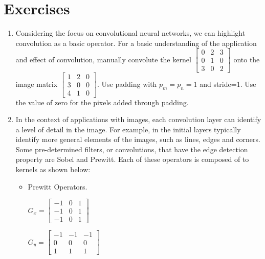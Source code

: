 \newpage
\section{Exercises}

\begin{enumerate}

\item \noindent Considering the focus on convolutional neural networks, we can highlight convolution as a basic operator. For a basic understanding of the application and effect of convolution, manually convolute the kernel $\left[\begin{smallmatrix}
0 & 2 & 3\\
0 & 1 & 0\\
3 & 0 & 2
\end{smallmatrix}\right]$ onto the image matrix $\left[\begin{smallmatrix}
1 & 2 & 0\\
3 & 0 & 0\\
4 & 1 & 0
\end{smallmatrix}\right]$. Use padding with $p_m = p_n = 1$ and stride=1. Use the value of zero for the pixels added through padding.


\item \noindent In the context of applications with images, each convolution layer can identify a level of detail in the image. For example, in the initial layers typically identify more general elements of the images, such as lines, edges and corners. Some pre-determined filters, or convolutions, that have the edge detection property are Sobel and Prewitt. Each of these operators is composed of to kernels as shown below:


\begin{itemize}
\item Prewitt Operators. 

$G_x= \left[\begin{smallmatrix}
-1 & 0 & 1\\
-1 & 0 & 1\\
-1 & 0 & 1
\end{smallmatrix}\right]$

$G_y = \left[\begin{smallmatrix}
-1 & -1 & -1\\
 0 &  0 &  0\\
 1 &  1 &  1
\end{smallmatrix}\right]$


\end{itemize}
\end{enumerate}
